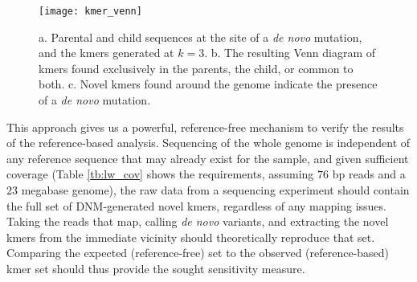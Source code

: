 \begin{figure}[h!]
  \centering
    \texttt{[image: kmer\_venn]}
  \caption{a. Parental and child sequences at the site of a \textit{de novo} mutation, and the kmers generated at $k=3$.  b. The resulting Venn diagram of kmers found exclusively in the parents, the child, or common to both.  c. Novel kmers found around the genome indicate the presence of a \textit{de novo} mutation.}
  \label{fig:kmer_venn}
\end{figure}

This approach gives us a powerful, reference-free mechanism to verify the results of the reference-based analysis.  Sequencing of the whole genome is independent of any reference sequence that may already exist for the sample, and given sufficient coverage (Table \ref{tb:lw_cov} shows the requirements, assuming $76$ bp reads and a $23$ megabase genome), the raw data from a sequencing experiment should contain the full set of DNM-generated novel kmers, regardless of any mapping issues\cite{Lander:1988bp}.  Taking the reads that map, calling \textit{de novo} variants, and extracting the novel kmers from the immediate vicinity should theoretically reproduce that set.  Comparing the expected (reference-free) set to the observed (reference-based) kmer set should thus provide the sought sensitivity measure.

